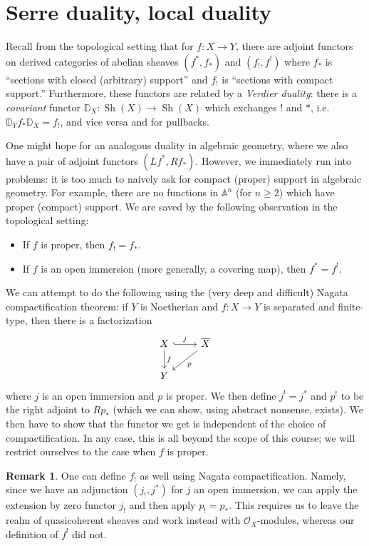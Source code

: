 \documentclass[10pt]{article}
\theoremstyle{definition}
\newtheorem{rmk}[thm]{Remark}
\DeclareMathOperator{\Sh}{Sh}
\newcommand{\OO}{\mathcal{O}}
\begin{document}
\newpage




\section{Serre duality, local duality}


Recall from the topological setting that for $f: X \rightarrow Y$, there are adjoint functors on derived categories of abelian sheaves $(f^*, f_*)$ and $(f_!, f^!)$ where $f_*$ is ``sections with closed (arbitrary) support'' and $f_!$ is ``sections with compact support.''  Furthermore, these functors are related by a \emph{Verdier duality}: there is a \emph{covariant} functor $\mathbb{D}_X: \Sh(X) \rightarrow \Sh(X)$ which exchanges $!$ and $*$, i.e. $\mathbb{D}_Y f_* \mathbb{D}_X = f_!$, and vice versa and for pullbacks.

One might hope for an analogous duality in algebraic geometry, where we also have a pair of adjoint functors $(Lf^*, Rf_*)$.  However, we immediately run into problems: it is too much to naively ask for compact (proper) support in algebraic geometry.  For example, there are no functions in $\mathbb{A}^n$ (for $n \geq 2$) which have proper (compact) support.  We are saved by the following observation in the topological setting:
\begin{itemize}
\item If $f$ is proper, then $f_! = f_*$.
\item If $f$ is an open immersion (more generally, a covering map), then $f^* = f^!$.  
\end{itemize}

We can attempt to do the following using the (very deep and difficult) Nagata compactification theorem: if $Y$ is Noetherian and $f: X \rightarrow Y$ is separated and finite-type, then there is a factorization
$$\begin{tikzcd}
X \arrow[d, "f"] \arrow[r, "j", hook] & \overline{X} \arrow[dl, "p"] \\
Y
\end{tikzcd}$$
where $j$ is an open immersion and $p$ is proper.  We then define $j^! = j^*$ and $p^!$ to be the right adjoint to $Rp_*$ (which we can show, using abstract nonsense, exists).  We then have to show that the functor we get is independent of the choice of compactification.  In any case, this is all beyond the scope of this course; we will restrict ourselves to the case when $f$ is proper.


\begin{rmk}
One can define $f_!$ as well using Nagata compactification.  Namely, since we have an adjunction $(j_!, j^*)$ for $j$ an open immersion, we can apply the extension by zero functor $j_!$ and then apply $p_! = p_*$.  This requires us to leave the realm of quasicoherent sheaves and work instead with $\OO_X$-modules, whereas our definition of $f^!$ did not.
\end{rmk}
\end{document}
